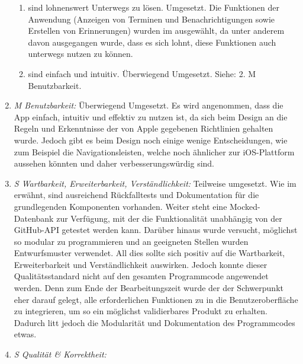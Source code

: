 \begin{enumerate}
\begin{enumerate}[label*={\arabic*}]
			\item sind lohnenswert Unterwegs zu lösen.\newline%
				Umgesetzt. Die Funktionen der Anwendung (Anzeigen von Terminen und Benachrichtigungen sowie Erstellen von Erinnerungen) wurden im  ausgewählt, da unter anderem davon ausgegangen wurde, dass es sich lohnt, diese Funktionen auch unterwegs nutzen zu können.
			\item sind einfach und intuitiv.\newline%
				Überwiegend Umgesetzt. Siehe: 2. M Benutzbarkeit. 
		\end{enumerate}
	
	\item \textit{M Benutzbarkeit:}\newline%
		Überwiegend Umgesetzt. Es wird angenommen, dass die App einfach, intuitiv und effektiv zu nutzen ist, da sich beim Design an die Regeln und Erkenntnisse der von Apple gegebenen Richtlinien gehalten wurde.%
		\newline%
		Jedoch gibt es beim Design noch einige wenige Entscheidungen, wie zum Beispiel die Navigationsleisten, welche noch ähnlicher zur iOS-Plattform aussehen könnten und daher verbesserungswürdig sind.%
	\item \textit{S Wartbarkeit, Erweiterbarkeit, Verständlichkeit:}\newline%
		Teilweise umgesetzt. Wie im  erwähnt, sind ausreichend Rückfalltests und Dokumentation für die grundlegenden Komponenten vorhanden. Weiter steht eine Mocked-Datenbank zur Verfügung, mit der die Funktionalität unabhängig von der GitHub-API getestet werden kann. Darüber hinaus wurde versucht, möglichst so modular zu programmieren und an geeigneten Stellen wurden Entwurfsmuster verwendet. All dies sollte sich positiv auf die Wartbarkeit, Erweiterbarkeit und Verständlichkeit auswirken.%
		Jedoch konnte dieser Qualitätsstandard nicht auf den gesamten Programmcode angewendet werden. Denn zum Ende der Bearbeitungszeit wurde der der Schwerpunkt eher darauf gelegt, alle erforderlichen Funktionen zu in die Benutzeroberfläche zu integrieren, um so ein möglichst validierbares Produkt zu erhalten. Dadurch litt jedoch die Modularität und Dokumentation des Programmcodes etwas.%
	\item \textit{S Qualität \& Korrektheit:}\newline%

\end{enumerate}
